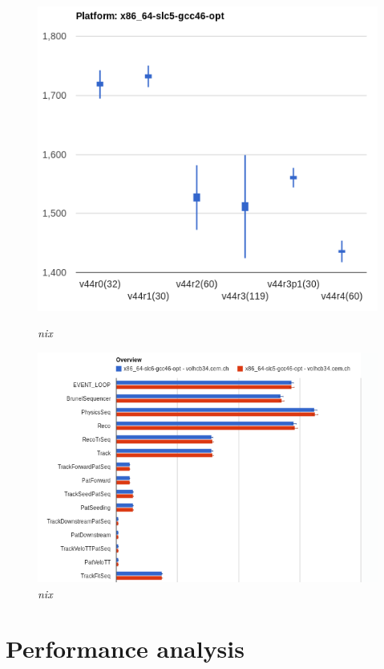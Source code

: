 \documentclass[a4paper]{jpconf}
\begin{document}
\begin{figure}[t]
\begin{minipage}[t]{17pc}
\includegraphics[scale=0.4]{figures/trend_brunel.png}
\caption{\small \textit{nix}}
\label{fig:trend}
\end{minipage}\hspace{1pc}%
\begin{minipage}[t]{17pc}
\includegraphics[scale=0.4]{figures/overview_brunel.png}
\caption{\small \textit{nix}}
\label{fig:overview}
\end{minipage}
\end{figure}

\section{Performance analysis}
\label{sec:performance_analysis}
\end{document}
